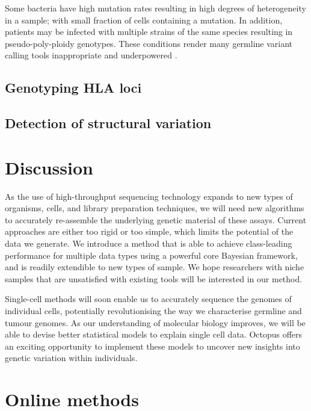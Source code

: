 \documentclass[notitlepage, twocolumn]{article}
\begin{document}
Some bacteria have high mutation rates resulting in high degrees of heterogeneity in a sample; with small fraction of cells containing a mutation. In addition, patients may be infected with multiple strains of the same species resulting in pseudo-poly-ploidy genotypes. These conditions render many germline variant calling tools inappropriate and underpowered \cite{RN165}.

\subsection*{Genotyping HLA loci}

\subsection*{Detection of structural variation}

\section*{Discussion}

As the use of high-throughput sequencing technology expands to new types of organisms, cells, and library preparation techniques, we will need new algorithms to accurately re-assemble the underlying genetic material of these assays. Current approaches are either too rigid or too simple, which limits the potential of the data we generate. We introduce a method that is able to achieve class-leading performance for multiple data types using a powerful core Bayesian framework, and is readily extendible to new types of sample. We hope researchers with niche samples that are unsatisfied with existing tools will be interested in our method.

Single-cell methods will soon enable us to accurately sequence the genomes of individual cells, potentially revolutionising the way we characterise germline and tumour genomes. As our understanding of molecular biology improves, we will be able to devise better statistical models to explain single cell data. Octopus offers an exciting opportunity to implement these models to uncover new insights into genetic variation within individuals.




\section*{Online methods}
\end{document}
